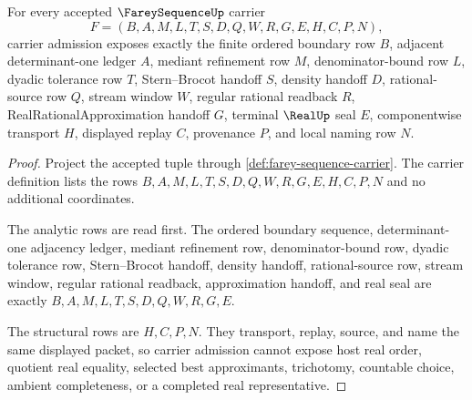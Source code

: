 \begin{theorem}
\label{thm:farey-sequence-carrier-admission}
For every accepted $\FareySequenceUp$ carrier
$$
F=(B,A,M,L,T,S,D,Q,W,R,G,E,H,C,P,N),
$$
carrier admission exposes exactly the finite ordered boundary row $B$, adjacent determinant-one ledger $A$, mediant refinement row $M$, denominator-bound row $L$, dyadic tolerance row $T$, Stern--Brocot handoff $S$, density handoff $D$, rational-source row $Q$, stream window $W$, regular rational readback $R$, RealRationalApproximation handoff $G$, terminal $\RealUp$ seal $E$, componentwise transport $H$, displayed replay $C$, provenance $P$, and local naming row $N$.
\end{theorem}
\begin{proof}
Project the accepted tuple through \autoref{def:farey-sequence-carrier}. The carrier definition lists the rows $B,A,M,L,T,S,D,Q,W,R,G,E,H,C,P,N$ and no additional coordinates.

The analytic rows are read first. The ordered boundary sequence, determinant-one adjacency ledger, mediant refinement row, denominator-bound row, dyadic tolerance row, Stern--Brocot handoff, density handoff, rational-source row, stream window, regular rational readback, approximation handoff, and real seal are exactly $B,A,M,L,T,S,D,Q,W,R,G,E$.

The structural rows are $H,C,P,N$. They transport, replay, source, and name the same displayed packet, so carrier admission cannot expose host real order, quotient real equality, selected best approximants, trichotomy, countable choice, ambient completeness, or a completed real representative.
\end{proof}

